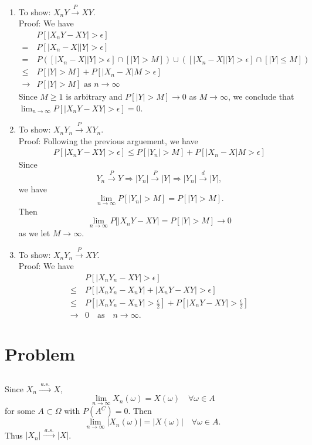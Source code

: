 \documentclass{article}[12pt]
\newcommand{\pto}{\overset{P}{\to}}
\newcommand{\dto}{\overset{d}{\to}}
\newcommand{\as}{\;a.s.\;}
\newcommand{\asto}{\overset{\as}{\to}}
\begin{document}
\begin{enumerate}
\item To show: $X_n Y \pto XY$. \\
  Proof: We have
  \begin{align*}
    & P[|X_n Y - XY| > \epsilon] \\
    = & P[|X_n-X||Y| > \epsilon] \\
    = & P([|X_n-X||Y| > \epsilon] \cap  [|Y| > M]) \cup ([|X_n-X||Y| > \epsilon] \cap  [|Y| \leq M]) \\
    \leq & P[|Y| > M] + P[|X_n-X|M > \epsilon] \\
    \to & P[|Y| > M] \text{ as } n \to \infty
  \end{align*}
  Since $M \geq 1$ is arbitrary and $P[|Y| > M] \to 0$ as $M \to \infty$,
  we conclude that $\lim_{n \to \infty} P[|X_nY - XY| > \epsilon] = 0$.
\item To show: $X_n Y_n \pto X Y_n$. \\
  Proof: Following the previous arguement, we have
  \begin{align*}
    P[|X_n Y - XY| > \epsilon] \leq P[|Y_n| > M] + P[|X_n-X|M > \epsilon] 
  \end{align*}
  Since
  \[
    Y_n \pto Y \Rightarrow |Y_n| \pto |Y| \Rightarrow |Y_n| \dto |Y|,
  \]
  we have
  \[
    \lim_{n \to \infty} P[|Y_n| > M] = P[|Y| > M].
  \]
  Then
  \[
    \lim_{n \to \infty} P[|X_n Y - XY| = P[|Y| > M] \to 0
  \]
  as we let $M \to \infty$.
\item To show: $X_nY_n \pto XY$. \\
  Proof: We have
  \begin{align*}
    & P[|X_nY_n-XY| > \epsilon] \\
    \leq & P[|X_nY_n-X_nY| + |X_nY-XY| > \epsilon] \\
    \leq & P[|X_n Y_n - X_n Y| > \frac{\epsilon}{2}] + P[|X_n Y - XY| > \frac{\epsilon}{2}] \\
    \to & 0 \quad\text{as}\quad n \to \infty.
  \end{align*}
\end{enumerate}

\section{Problem}

\subsection{}
Since $X_n \asto X$,
\[
  \lim_{n \to \infty} X_n(\omega) = X(\omega) \quad \forall \omega \in A
\]
for some $A \subset \Omega$ with $P(A^C) = 0$.
Then 
\[
  \lim_{n \to \infty} |X_n(\omega)| = |X(\omega)| \quad \forall \omega \in A.
\]
Thus $|X_n| \asto |X|$.
\end{document}
